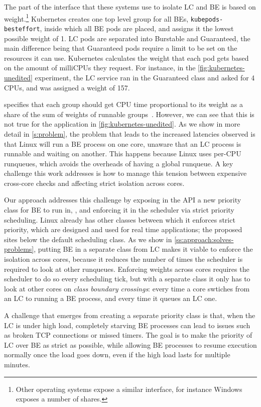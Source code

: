 The part of the \cgroups{} interface that these systems use to isolate LC and BE
is based on weight.\footnote{Other operating systems expose a similar interface,
for instance Windows exposes a number of shares.} Kubernetes creates one top
level group for all BEs, \texttt{kubepods-besteffort}, inside which all BE pods
are placed, and assigns it the lowest possible weight of 1. LC pods are
separated into Burstable and Guaranteed, the main difference being that
Guaranteed pods require a limit to be set on the resources it can use.
Kubernetes calculates the weight that each pod gets based on the amount of
milliCPUs they request. For instance, in the \autoref{fig:kubernetes-unedited}
experiment, the LC service ran in the Guaranteed class and asked for 4 CPUs, and
was assigned a weight of 157. 

\cgroups{} specifies that each group should get CPU time proportional to its
weight as a share of the sum of weights of runnable
groups~\cite{cgroups-kerneldocs}. However, we can see that this is not true for
the application in \autoref{fig:kubernetes-unedited}. As we show in more detail
in \autoref{s:problem}, the problem that leads to the increased latencies
observed is that Linux will run a BE process on one core, unaware that an LC
process is runnable and waiting on another. This happens because Linux uses
per-CPU runqueues, which avoids the overheads of having a global runqueue. A key
challenge this work addresses is how to manage this tension between expensive
cross-core checks and affecting strict isolation across cores.

Our approach addresses this challenge by exposing in the API a new priority
class for BE to run in, \beclass{}, and enforcing it in the scheduler via strict
priority scheduling. Linux already has other classes between which it enforces
strict priority, which are designed and used for real time applications; the
proposed \schedbe{} sites below the default scheduling class. As we show in
\autoref{ss:approach:solves-problems}, putting BE in a separate class from LC
makes it viable to enforce the isolation across cores, because it reduces the
number of times the scheduler is required to look at other runqueues. Enforcing
weights across cores requires the scheduler to do so every scheduling tick, but
with a separate class it only has to look at other cores on \textit{class
boundary crossings}: every time a core swtiches from an LC to running a BE
process, and every time it queues an LC one.

A challenge that emerges from creating a separate priority class is that, when
the LC is under high load, completely starving BE processes can lead to issues
such as broken TCP connections or missed timers. The goal is to make the
priority of LC over BE as strict as possible, while allowing BE processes to
resume execution normally once the load goes down, even if the high load lasts
for multiple minutes.

